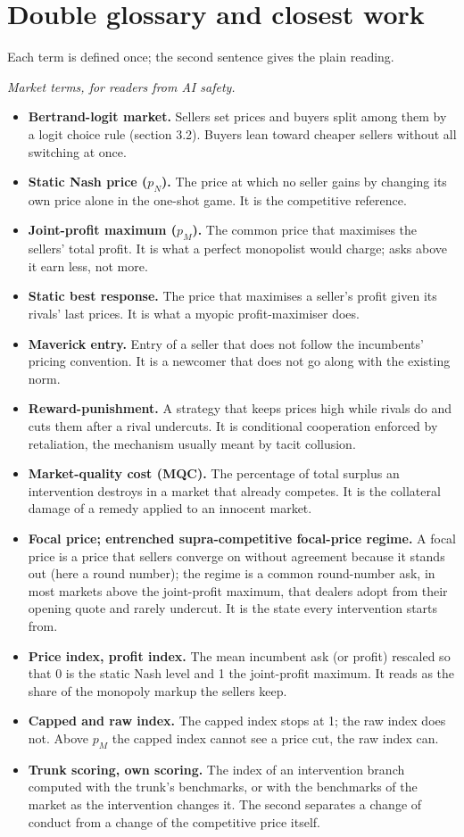 \documentclass[11pt,a4paper]{article}
\begin{document}


\appendix
\section{Double glossary and closest work}
Each term is defined once; the second sentence gives the plain reading.

\emph{Market terms, for readers from AI safety.}

\begin{itemize}
\item \textbf{Bertrand-logit market.} Sellers set prices and buyers split among them by a logit choice rule (section 3.2). Buyers lean toward cheaper sellers without all switching at once.
\item \textbf{Static Nash price ($p_N$).} The price at which no seller gains by changing its own price alone in the one-shot game. It is the competitive reference.
\item \textbf{Joint-profit maximum ($p_M$).} The common price that maximises the sellers' total profit. It is what a perfect monopolist would charge; asks above it earn less, not more.
\item \textbf{Static best response.} The price that maximises a seller's profit given its rivals' last prices. It is what a myopic profit-maximiser does.
\item \textbf{Maverick entry.} Entry of a seller that does not follow the incumbents' pricing convention. It is a newcomer that does not go along with the existing norm.
\item \textbf{Reward-punishment.} A strategy that keeps prices high while rivals do and cuts them after a rival undercuts. It is conditional cooperation enforced by retaliation, the mechanism usually meant by tacit collusion.
\item \textbf{Market-quality cost (MQC).} The percentage of total surplus an intervention destroys in a market that already competes. It is the collateral damage of a remedy applied to an innocent market.
\item \textbf{Focal price; entrenched supra-competitive focal-price regime.} A focal price is a price that sellers converge on without agreement because it stands out (here a round number); the regime is a common round-number ask, in most markets above the joint-profit maximum, that dealers adopt from their opening quote and rarely undercut. It is the state every intervention starts from.
\item \textbf{Price index, profit index.} The mean incumbent ask (or profit) rescaled so that 0 is the static Nash level and 1 the joint-profit maximum. It reads as the share of the monopoly markup the sellers keep.
\item \textbf{Capped and raw index.} The capped index stops at 1; the raw index does not. Above $p_M$ the capped index cannot see a price cut, the raw index can.
\item \textbf{Trunk scoring, own scoring.} The index of an intervention branch computed with the trunk's benchmarks, or with the benchmarks of the market as the intervention changes it. The second separates a change of conduct from a change of the competitive price itself.
\end{itemize}
\end{document}
